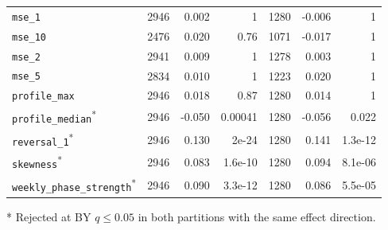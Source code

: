 \begin{longtable}{p{}rrrrrr}
\raggedright \nolinkurl{mse_1} & 2946 & 0.002 & 1 & 1280 & -0.006 & 1 \\
\raggedright \nolinkurl{mse_10} & 2476 & 0.020 & 0.76 & 1071 & -0.017 & 1 \\
\raggedright \nolinkurl{mse_2} & 2941 & 0.009 & 1 & 1278 & 0.003 & 1 \\
\raggedright \nolinkurl{mse_5} & 2834 & 0.010 & 1 & 1223 & 0.020 & 1 \\
\raggedright \nolinkurl{profile_max} & 2946 & 0.018 & 0.87 & 1280 & 0.014 & 1 \\
\raggedright \nolinkurl{profile_median}\textsuperscript{*} & 2946 & -0.050 & 0.00041 & 1280 & -0.056 & 0.022 \\
\raggedright \nolinkurl{reversal_1}\textsuperscript{*} & 2946 & 0.130 & 2e-24 & 1280 & 0.141 & 1.3e-12 \\
\raggedright \nolinkurl{skewness}\textsuperscript{*} & 2946 & 0.083 & 1.6e-10 & 1280 & 0.094 & 8.1e-06 \\
\raggedright \nolinkurl{weekly_phase_strength}\textsuperscript{*} & 2946 & 0.090 & 3.3e-12 & 1280 & 0.086 & 5.5e-05 \\
\bottomrule\end{longtable}
* Rejected at BY $q\leq0.05$ in both partitions with the same effect direction.\endgroup
